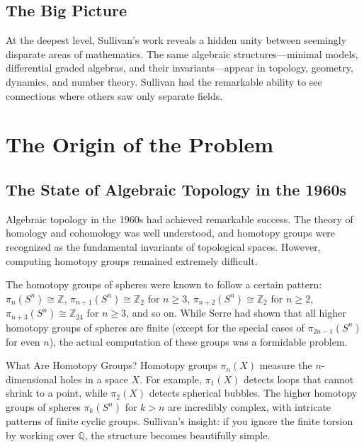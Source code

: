 \subsection{The Big Picture}

At the deepest level, Sullivan's work reveals a hidden unity between seemingly disparate areas of mathematics. The same algebraic structures---minimal models, differential graded algebras, and their invariants---appear in topology, geometry, dynamics, and number theory. Sullivan had the remarkable ability to see connections where others saw only separate fields.

\section{The Origin of the Problem}

\subsection{The State of Algebraic Topology in the 1960s}

Algebraic topology in the 1960s had achieved remarkable success. The theory of homology and cohomology was well understood, and homotopy groups were recognized as the fundamental invariants of topological spaces. However, computing homotopy groups remained extremely difficult.

The homotopy groups of spheres were known to follow a certain pattern: $\pi_n(S^n) \cong \mathbb{Z}$, $\pi_{n+1}(S^n) \cong \mathbb{Z}_2$ for $n \geq 3$, $\pi_{n+2}(S^n) \cong \mathbb{Z}_2$ for $n \geq 2$, $\pi_{n+3}(S^n) \cong \mathbb{Z}_{24}$ for $n \geq 3$, and so on. While Serre had shown that all higher homotopy groups of spheres are finite (except for the special cases of $\pi_{2n-1}(S^n)$ for even $n$), the actual computation of these groups was a formidable problem.

\begin{knowledgebridge}{What Are Homotopy Groups?}
Homotopy groups $\pi_n(X)$ measure the $n$-dimensional holes in a space $X$. For example, $\pi_1(X)$ detects loops that cannot shrink to a point, while $\pi_2(X)$ detects spherical bubbles. The higher homotopy groups of spheres $\pi_k(S^n)$ for $k > n$ are incredibly complex, with intricate patterns of finite cyclic groups. Sullivan's insight: if you ignore the finite torsion by working over $\mathbb{Q}$, the structure becomes beautifully simple.
\end{knowledgebridge}

